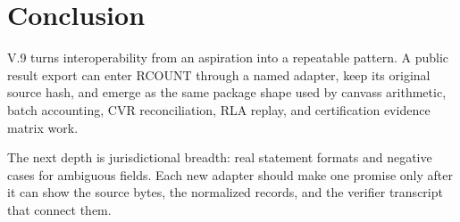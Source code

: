 \section{Conclusion}

V.9 turns interoperability from an aspiration into a repeatable pattern. A
public result export can enter RCOUNT through a named adapter, keep its original
source hash, and emerge as the same package shape used by canvass arithmetic,
batch accounting, CVR reconciliation, RLA replay, and certification evidence
matrix work.

The next depth is jurisdictional breadth: real statement formats and negative
cases for ambiguous fields. Each new adapter should make one promise only after
it can show the source bytes, the normalized records, and the verifier transcript
that connect them.

